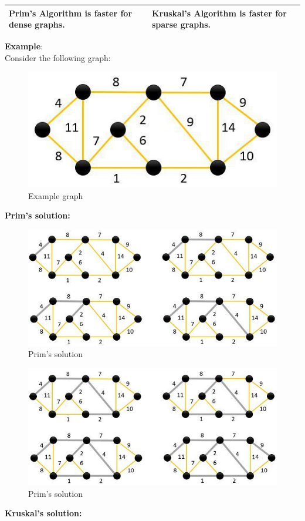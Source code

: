 \documentclass[11pt]{article}
\begin{document}
\begin{enumerate}
\begin{table}[H]
\begin{tabular}{|l|l|}
                  Prim’s Algorithm is faster for dense graphs.                                                                                                               & Kruskal’s Algorithm is faster for sparse graphs.                                                                                                                 \\ \hline
              \end{tabular}
          \end{table}
          \textbf{Example}: \\
          Consider the following graph:
          \begin{figure}[H]
              \centering
              \includegraphics[width=.45\textwidth]{figures/Example.jpg}
              \caption{Example graph}
          \end{figure}

          \textbf{Prim's solution:} \\

          \begin{figure}[H]
              \centering
              \includegraphics[width=.45\textwidth]{figures/Solution.jpg}
              \caption{Prim's solution}
          \end{figure}
          \begin{figure}[H]
              \centering
              \includegraphics[width=.45\textwidth]{figures/Solution-part-2.jpg}
              \caption{Prim's solution}
          \end{figure}
          \textbf{Kruskal's solution: }\\


\end{enumerate}
\end{document}
